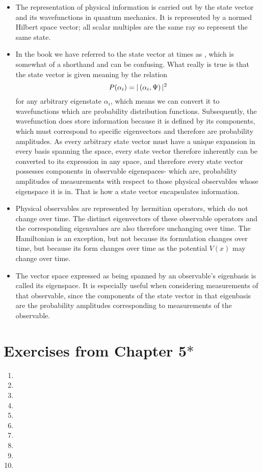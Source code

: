 \begin{itemize}
    \item The representation of physical information is carried out by the state vector and its wavefunctions in quantum mechanics. It is represented by a normed Hilbert space vector; all scalar multiples are the same ray so represent the same state.
    \item In the book we have referred to the state vector at times as , which is somewhat of a shorthand and can be confusing. What really is true is that the state vector is given meaning by the relation
    $$
    P(\alpha_{i})=|\left(\alpha_{i},\Psi\right)|^{2}
    $$
    for any arbitrary eigenstate $\alpha_{i}$, which means we can convert it to wavefunctions which are probability distribution functions. Subsequently, the wavefunction does store information because it is defined by its components, which must correspond to specific eigenvectors and therefore are probability amplitudes. As every arbitrary state vector must have a unique expansion in every basis spanning the space, every state vector therefore inherently can be converted to its expression in any space, and therefore every state vector possesses components in observable eigenspaces- which are, probability amplitudes of measurements with respect to those physical observables whose eigenspace it is in. That is how a state vector encapsulates information.
    \item Physical observables are represented by hermitian operators, which do not change over time. The distinct eigenvectors of these observable operators and the corresponding eigenvalues are also therefore unchanging over time. The Hamiltonian is an exception, but not because its formulation changes over time, but because its form changes over time as the potential $V(x)$ may change over time.
    \item The vector space expressed as being spanned by an observable's eigenbasis is called its eigenspace. It is especially useful when considering measurements of that observable, since the components of the state vector in that eigenbasis are the probability amplitudes corresponding to measurements of the observable.
\end{itemize}
\section{Exercises from Chapter 5$\ast$}
\begin{enumerate}
    \item 
    \item
    \item
    \item
    \item
    \item
    \item
    \item
    \item
    \item
\end{enumerate}